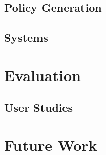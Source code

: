 \documentclass{article}
\begin{document}
\subsection{Policy Generation}

\subsection{Systems}


\section{Evaluation}

\subsection{User Studies}

\section{Future Work}
\end{document}
